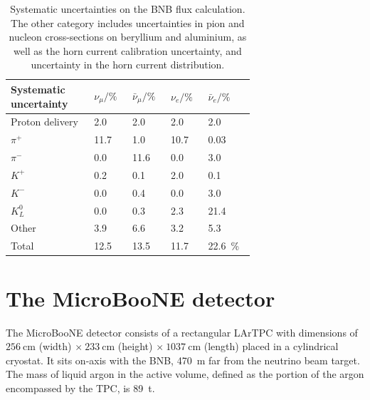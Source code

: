 \begin{table}[htbp]
   \centering
     \caption{Systematic uncertainties on the BNB flux calculation. The other category includes uncertainties in pion and nucleon cross-sections on beryllium and aluminium, as well as the horn current calibration uncertainty, and uncertainty in the horn current distribution.}
   \begin{tabular}{p{0.28\linewidth}p{0.1\linewidth}p{0.1\linewidth}p{0.1\linewidth}p{0.1\linewidth}}
     \toprule
     Systematic uncertainty & $\nu_{\mu}/\%$ & $\bar{\nu}_{\mu}/\%$ & $\nu_e/\%$ & $\bar{\nu}_e/\%$ \\
     \midrule
     Proton delivery & 2.0 & 2.0 & 2.0 & 2.0 \\
     $\pi^+$ & 11.7 & 1.0 & 10.7 & 0.03 \\ 
     $\pi^-$ & 0.0 & 11.6 & 0.0 & 3.0 \\
     $K^+$ & 0.2 & 0.1 & 2.0 & 0.1 \\
     $K^-$ & 0.0 & 0.4 & 0.0 & 3.0 \\
     $K^0_L$ & 0.0 & 0.3 & 2.3 & 21.4 \\
     Other & 3.9 & 6.6 & 3.2 & 5.3 \\
     \midrule
     Total & 12.5 & 13.5 & 11.7 & 22.6~\%\\
     \bottomrule
   \end{tabular}
\label{tab:flux_syst}
\end{table}


\section{The MicroBooNE detector}\label{sec:detector}
The MicroBooNE detector consists of a rectangular LArTPC with dimensions of $256~$cm (width) $\times~233~$cm (height) $\times~1037~$cm (length) placed in a cylindrical cryostat. It sits on-axis with the BNB, 470~m far from the neutrino beam target. The mass of liquid argon in the active volume, defined as the portion of the argon encompassed by the TPC, is 89~t. 


